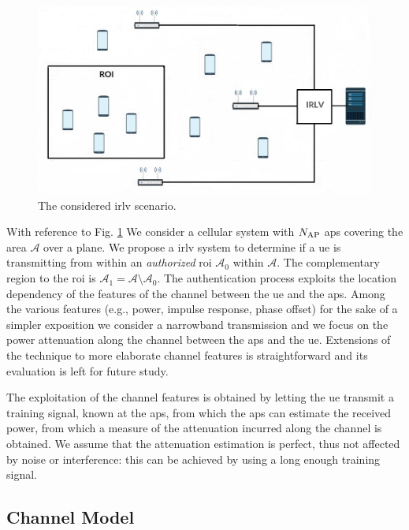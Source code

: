 \documentclass[draftcls,onecolumn,12pt]{IEEEtran}
\begin{document}
\begin{figure}
    \centering
    \includegraphics[width=0.6\columnwidth]{irlv.JPG}
    \caption{The considered \ac{irlv} scenario.}
    \label{fig1}
\end{figure}

With reference to Fig. \ref{fig1} We consider a cellular system with $N_{\rm AP}$ \acp{ap} covering the area $\mathcal{A}$ over a plane. We propose a \ac{irlv} system to determine if a \ac{ue} is transmitting from within an {\em authorized} \ac{roi} $\mathcal{A}_0$ within   $\mathcal{A}$. The complementary region to the \ac{roi} is  $\mathcal{A}_1=\mathcal{A} \setminus \mathcal{A}_0$. The authentication process exploits the location dependency of the features of the channel between the \ac{ue} and the \acp{ap}.  Among the various features (e.g., power, impulse response, phase offset) for the sake of a simpler exposition we consider a narrowband transmission and we focus on the power attenuation along the channel between the  \acp{ap} and the \ac{ue}. Extensions of the technique to more elaborate channel features is straightforward and its evaluation is left for future study.

The exploitation of the channel features is obtained by letting the \ac{ue} transmit a training signal, known at the \acp{ap}, from which the \acp{ap} can estimate the received power, from which a measure of the attenuation incurred along the channel is obtained. We assume that the attenuation estimation is perfect, thus not affected by noise or interference: this can be achieved by using a long enough training signal.




\subsection{Channel Model}
\end{document}
